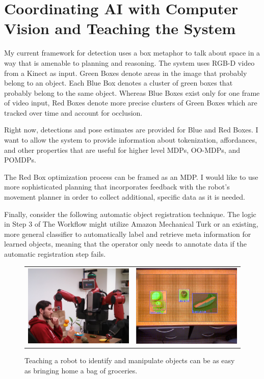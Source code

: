 \documentclass[12pt]{article}
\numberwithin{equation}{section}
\numberwithin{table}{section}
\numberwithin{figure}{section}
\begin{document}
\section{Coordinating AI with Computer Vision and Teaching the System}
My current framework for detection uses a box metaphor to talk about space in a way that 
is amenable to planning and reasoning. The system uses RGB-D video from a Kinect as input.
Green Boxes denote areas in the image that probably belong to an object. Each Blue Box denotes
a cluster of green boxes that probably belong to the same object. Whereas Blue Boxes exist only for
one frame of video input, Red Boxes denote more precise clusters of Green Boxes which are tracked over time 
and account for occlusion.

Right now, detections and pose estimates are provided for Blue and Red Boxes. I want to allow the system
to provide information about tokenization, affordances, and other properties that are useful for higher level
MDPs, OO-MDPs, and POMDPs.

The Red Box optimization process can be framed as an MDP. I would like to use more sophisticated planning
that incorporates feedback with the robot's movement planner in order to collect additional, specific data 
as it is needed.

Finally, consider the following automatic object registration technique.  
The logic in Step 3 of The Workflow might utilize Amazon Mechanical Turk 
or an existing, more general classifier to automatically label and retrieve meta information for learned 
objects, meaning that the operator only needs to annotate data if the automatic registration step fails.

\begin{figure}
  \begin{center}
    \begin{tabular}{l c}
      \includegraphics[width=200px, height=150px]{robo2.png} &
      \includegraphics[width=200px, height=150px]{screen2.png} \\
    \end{tabular}
  \end{center}
  \caption{Teaching a robot to identify and manipulate objects can be as easy as bringing home
	    a bag of groceries.}
\end{figure}
\end{document}
